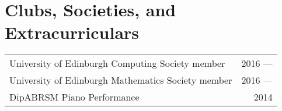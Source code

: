 \documentclass[11pt,a4paper]{article}
\begin{document}
\hline
\section*{Clubs, Societies, and Extracurriculars}
\begin{tabularx}{\textwidth}{X r}
    University of Edinburgh Computing Society member & 2016 --- \\
    University of Edinburgh Mathematics Society member & 2016 ---\\
    DipABRSM Piano Performance & 2014
\end{tabularx}
\end{document}
